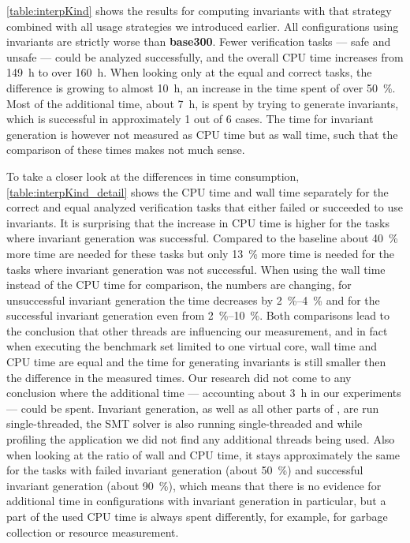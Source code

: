 \autoref{table:interpKind} shows the results for computing invariants with that strategy combined with all usage strategies we introduced earlier. All configurations using invariants are strictly worse
than \textbf{base300}. Fewer verification tasks --- safe and unsafe --- could be analyzed successfully, and the overall CPU time increases from \SI{149}{\hour} to over \SI{160}{\hour}.
When looking only at the equal and correct tasks, the difference is growing to almost \SI{10}{\hour}, an increase in the time spent of over \SI{50}{\percent}.
Most of the additional time, about \SI{7}{\hour}, is spent by trying to generate invariants, which is
successful in approximately 1 out of 6 cases. The time for invariant generation is however not measured as CPU time but as wall time, such that the comparison of these times makes not much sense.




To take a closer look at the differences in time consumption, \autoref{table:interpKind_detail} shows the CPU time and wall time separately for the correct and equal analyzed verification tasks that either
failed or  succeeded to use invariants. It is surprising that the increase in CPU time is higher for the tasks where invariant generation was successful. Compared to the baseline
about \SI{40}{\percent} more time are needed for these tasks but only \SI{13}{\percent} more time is needed for the tasks where invariant generation was not successful.
When using the wall time instead of the CPU time for
comparison, the numbers are changing, for unsuccessful invariant generation the time decreases by \SIrange{2}{4}{\percent}
and for the successful invariant generation even from \SIrange{2}{10}{\percent}.
Both comparisons lead to the conclusion that other threads are influencing our measurement, and in fact when executing the benchmark set limited to one virtual core, wall time and CPU time are equal and
the time for generating invariants is still smaller then the difference in the measured times. Our research did not come to any conclusion where the additional time --- accounting about \SI{3}{\hour} in our
experiments --- could be spent. Invariant generation, as well as all other parts of \CPAchecker{}, are run single-threaded, the \ac{SMT} solver \MathSAT{} is also running single-threaded and while 
profiling the application we did not find any additional threads being used. Also when looking at the ratio of wall and CPU time, it stays approximately the same for the tasks with failed invariant 
generation (about \SI{50}{\percent}) and successful invariant generation (about \SI{90}{\percent}), which means that there is no evidence for additional
time in configurations with invariant generation in particular, but a part
of the used CPU time is always spent differently, for example, for garbage collection or resource measurement.


